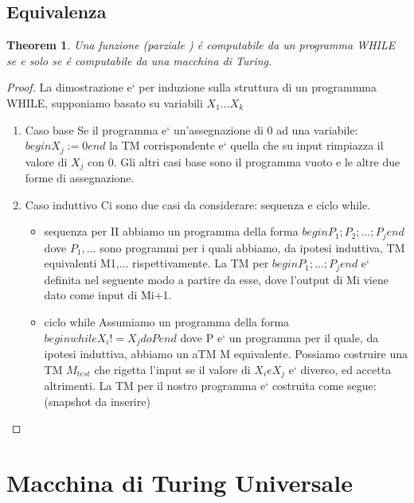 \documentclass[a4paper, 12pt]{article}
\newtheorem{theorem}{Theorem}[section]
\begin{document}
\subsection{Equivalenza}
\begin{theorem}
Una funzione (parziale ) é computabile da un programma WHILE se e solo se é computabile da una macchina di Turing.
\end{theorem}
\begin{proof}
La dimostrazione e` per induzione sulla struttura di un programmma WHILE, supponiamo basato su variabili \(X_1...X_k\)
\begin{enumerate}
\item Caso base
	Se il programma e` un'assegnazione di 0 ad una variabile:
	\(begin X_j := 0 end\) la TM corrispondente e` quella che su input rimpiazza il valore di \(X_j\) con 0.
	Gli altri casi base sono il programma vuoto e le altre due forme di assegnazione.
\item Caso induttivo
	Ci sono due casi da considerare: sequenza e ciclo while.
	\begin{itemize}
	\item sequenza
		per II abbiamo un programma della forma \(begin P_1;P_2;...;P_j end\)
		dove \(P_1,...\) sono programmi per i quali abbiamo, da ipotesi induttiva, TM equivalenti M1,... rispettivamente. La TM per \( begin P_1;...;P_j end\) e` definita nel seguente modo a partire da esse, dove l'output di Mi viene dato come input di Mi+1.
	\item ciclo while
	Assumiamo un programma della forma \(begin while X_{i} != X_j do P end \) dove P e` un programma per il quale, da ipotesi induttiva, abbiamo un aTM M  equivalente. Possiamo costruire una TM \(M_{test}\) che rigetta l'input se il valore di \(X_{i} e X_{j}\) e` diverso, ed accetta altrimenti. La TM per il nostro programma e` costruita come segue: (snapshot da inserire)
	\end{itemize}
\end{enumerate}
\end{proof}

\section{Macchina di Turing Universale}
\end{document}
